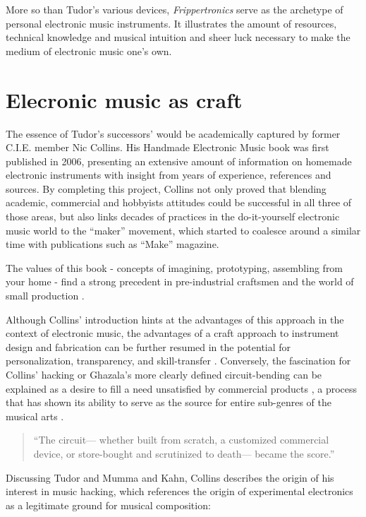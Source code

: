 More so than Tudor's various devices, \emph{Frippertronics} serve as the archetype of personal electronic music instruments. It illustrates the amount of resources, technical knowledge and musical intuition and sheer luck necessary to make the medium of electronic music one's own. 

\section{Elecronic music as craft} 

	The essence of Tudor’s successors’ would be academically captured by 
former C.I.E. member Nic Collins. His Handmade Electronic Music book was first published in 2006, presenting an extensive amount of information on homemade electronic instruments with insight from years of experience, references and sources. By completing this project, Collins not only proved that blending academic, commercial and hobbyists attitudes could be successful in all three of those areas, but also links decades of practices in the do-it-yourself electronic music world to the “maker” movement, which started to coalesce around a similar time with publications such as “Make” magazine.

	The values of this book - concepts of imagining, prototyping, assembling from your home - find a strong precedent in pre-industrial craftsmen and the world of small production \cite{collins2006,ghazala2005,kuivila2004}. 

Although Collins’ introduction hints at the advantages of this approach in the context of electronic music, the advantages of a craft approach to instrument design and fabrication can be further resumed in the potential for personalization, transparency, and skill-transfer \cite{perner2011}. Conversely, the fascination for Collins’ hacking or Ghazala’s more clearly defined circuit-bending can be explained as a desire to fill a need unsatisfied by commercial products \cite{dunne2005}, a process that has shown its ability to serve as the source for entire sub-genres of the musical arts \cite{dunne2005,kelly2009,novak2013}. 
\begin{quote}
“The circuit— whether built from scratch, a customized commercial device, or store-bought and scrutinized to death— became the score.”
\citep{collins2004}
\end{quote}

	Discussing Tudor and Mumma and Kahn, Collins describes the origin of his interest in music hacking, which references the origin of experimental electronics as a legitimate ground for musical composition: 

